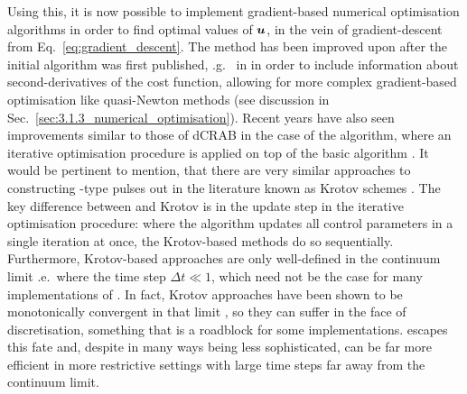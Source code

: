 Using this, it is now possible to implement gradient-based numerical optimisation algorithms in order to find optimal values of $\boldsymbol{u}$, in the vein of gradient-descent from Eq.~\ref{eq:gradient_descent}. The method has been improved upon after the initial algorithm was first published, \@e.g.~ in \cite{machnes_comparing_2011} in order to include information about second-derivatives of the cost function, allowing for more complex gradient-based optimisation like quasi-Newton methods (see discussion in Sec.~\ref{sec:3.1.3_numerical_optimisation}). Recent years have also seen improvements similar to those of dCRAB in the case of the  algorithm, where an iterative optimisation procedure is applied on top of the basic  algorithm \cite{chen_iterative_2022}. It would be pertinent to mention, that there are very similar approaches to constructing -type pulses out in the literature known as Krotov schemes \cite{reich_monotonically_2012}. The key difference between  and Krotov is in the update step in the iterative optimisation procedure: where the  algorithm updates all control parameters in a single iteration at once, the Krotov-based methods do so sequentially. Furthermore, Krotov-based approaches are only well-defined in the continuum limit \@i.e.~where the time step $\Delta t \ll 1$, which need not be the case for many implementations of . In fact, Krotov approaches have been shown to be monotonically convergent in that limit \cite{morzhin_krotov_2019}, so they can suffer in the face of discretisation, something that is a roadblock for some implementations.  escapes this fate and, despite in many ways being less sophisticated, can be far more efficient in more restrictive settings with large time steps far away from the continuum limit.

